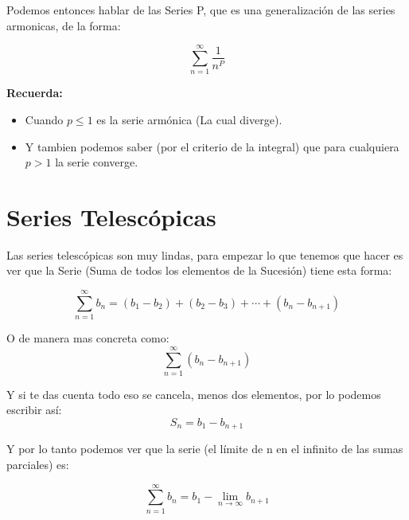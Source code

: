 \documentclass[12pt]{report}                                %
\begin{document}
        Podemos entonces hablar de las Series P, que es una generalización de las series
        armonicas, de la forma:

        \begin{equation}
            \sum_{n=1}^{\infty} \frac{1}{n^P}
        \end{equation}

        \textbf{Recuerda:}
        \begin{itemize}
            \item Cuando $p\leq1$ es la serie armónica (La cual diverge).
            \item Y tambien podemos saber (por el criterio de la integral) que para
            cualquiera $p > 1$ la serie converge.
        \end{itemize}


    \clearpage
    \section{Series Telescópicas}

        Las series telescópicas son muy lindas, para empezar lo que tenemos que
        hacer es ver que la Serie (Suma de todos los elementos de la Sucesión)
        tiene esta forma:

        \begin{equation}
            \sum_{n=1}^{\infty} b_n = (b_1-b_2) + (b_2-b_3) +  \cdots + (b_n-b_{n+1})
        \end{equation}

        O de manera mas concreta como:
        \begin{equation}
            \sum_{n=1}^{\infty} (b_{n} - b_{n+1})
        \end{equation}

        Y si te das cuenta todo eso se cancela, menos dos elementos, por lo podemos
        escribir así:
        \begin{equation}
            S_n = b_1 - b_{n+1}
        \end{equation}

        Y por lo tanto podemos ver que la serie (el límite de n en el
        infinito de las sumas parciales) es:

        \begin{equation}
            \sum_{n=1}^{\infty} b_n =  b_1 - \lim_{n \to \infty} b_{n+1}
        \end{equation}
\end{document}
